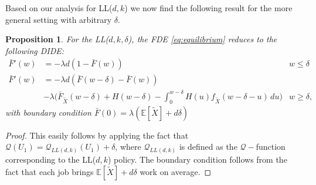 \documentclass[12pt]{report}
\newcommand{\E}{\mathbb{E}}
\newcommand{\QQ}{\mathcal{Q}}
\newtheorem{proposition}[theorem]{Proposition}
\begin{document}
Based on our analysis for LL($d,k$) we now find the following result for the more general setting with arbitrary $\delta$.
\begin{proposition}\label{prop:LLdkdelta}
For the LL($d,k,\delta$), the FDE \eqref{eq:equilibrium} reduces to the following DIDE:
\begin{align*}
\bar F'(w)&= -\lambda d (1-\bar F(w)) & w\leq \delta\\
\bar F'(w)&=-\lambda d (\bar F(w-\delta) - \bar F(w))\\
& -\lambda \bigg( \bar F_{\tilde{X}}(w-\delta) + H(w-\delta) - \int_0^{w-\delta} H(u) f_{\tilde{X}}(w-\delta-u)\, du \bigg)
& w \geq \delta,
\end{align*}
with boundary condition $\bar F(0) = \lambda (\E[\tilde X] + d \delta)$
\end{proposition}
\begin{proof}
This easily follows by applying the fact that $\QQ(U_1)=\QQ_{LL(d,k)}(U_1)+\delta$, where $\QQ_{LL(d,k)}$ is defined as the $\QQ-$function corresponding to the LL($d,k$) policy. The boundary condition follows from the fact that each job brings $\E[\tilde X]+d \delta$ work on average.
\end{proof}
\end{document}
